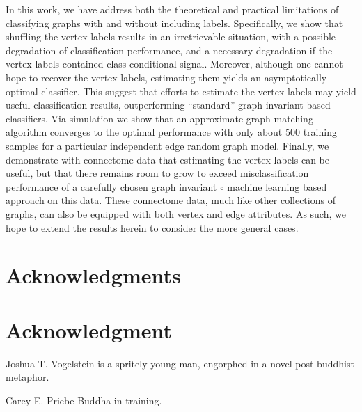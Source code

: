 \documentclass[10pt,journal,cspaper,compsoc]{IEEEtran}
\begin{document}
In this work, we have address both the theoretical and practical limitations of classifying graphs with and without including labels.  Specifically, we show that shuffling the vertex labels results in an irretrievable situation, with a possible degradation of classification performance, and a necessary degradation if the vertex labels contained class-conditional signal.  Moreover, although one cannot hope to recover the vertex labels, estimating them yields an asymptotically optimal classifier.  This suggest that efforts to estimate the vertex labels may yield useful classification results, outperforming ``standard'' graph-invariant based classifiers.  Via simulation we show that an approximate graph matching algorithm converges to the optimal performance with only about 500 training samples for a particular independent edge random graph model.   Finally, we demonstrate with connectome data that estimating the vertex labels can be useful, but that there remains room to grow to exceed misclassification performance of a carefully chosen graph invariant $\circ$ machine learning based approach on this data.   These connectome data, much like other collections of graphs, can also be equipped with both vertex and edge attributes.  As such, we hope to extend the results herein to consider the more general cases.








\ifCLASSOPTIONcompsoc
  \section*{Acknowledgments}
\else
  \section*{Acknowledgment}
\fi


\ifCLASSOPTIONcaptionsoff
  \newpage
\fi





\begin{IEEEbiography}{Joshua T. Vogelstein}
 is a spritely young man, engorphed in a novel post-buddhist metaphor.

\end{IEEEbiography}




\begin{IEEEbiography}{Carey E. Priebe}
Buddha in training.
\end{IEEEbiography}

\end{document}
